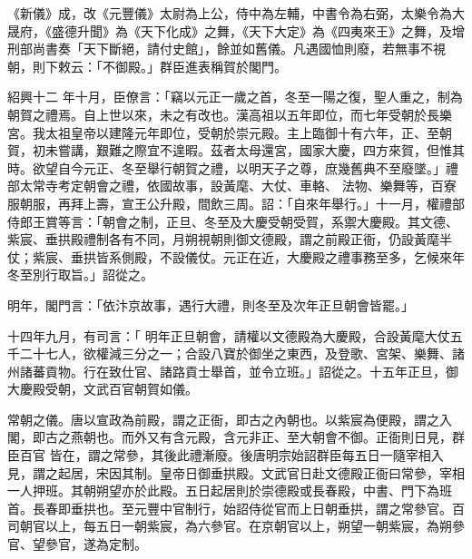 \begin{pinyinscope}
 《新儀》成，改《元豐儀》太尉為上公，侍中為左輔，中書令為右弼，太樂令為大晟府，《盛德升聞》為《天下化成》之舞，《天下大定》為《四夷來王》之舞，及增刑部尚書奏「天下斷絕，請付史館」，餘並如舊儀。凡遇國恤則廢，若無事不視朝，則下敕云：「不御殿。」群臣進表稱賀於閣門。



 紹興十二
 年十月，臣僚言：「竊以元正一歲之首，冬至一陽之復，聖人重之，制為朝賀之禮焉。自上世以來，未之有改也。漢高祖以五年即位，而七年受朝於長樂宮。我太祖皇帝以建隆元年即位，受朝於崇元殿。主上臨御十有六年，正、至朝賀，初未嘗講，艱難之際宜不遑暇。茲者太母還宮，國家大慶，四方來賀，但惟其時。欲望自今元正、冬至舉行朝賀之禮，以明天子之尊，庶幾舊典不至廢墜。」禮部太常寺考定朝會之禮，依國故事，設黃麾、大仗、車輅、
 法物、樂舞等，百寮服朝服，再拜上壽，宣王公升殿，間飲三周。詔：「自來年舉行。」十一月，權禮部侍郎王賞等言：「朝會之制，正旦、冬至及大慶受朝受賀，系禦大慶殿。其文德、紫宸、垂拱殿禮制各有不同，月朔視朝則御文德殿，謂之前殿正衙，仍設黃麾半仗；紫宸、垂拱皆系側殿，不設儀仗。元正在近，大慶殿之禮事務至多，乞候來年冬至別行取旨。」詔從之。



 明年，閣門言：「依汴京故事，遇行大禮，則冬至及次年正旦朝會皆罷。」



 十四年九月，有司言：「
 明年正旦朝會，請權以文德殿為大慶殿，合設黃麾大仗五千二十七人，欲權減三分之一；合設八寶於御坐之東西，及登歌、宮架、樂舞、諸州諸蕃貢物。行在致仕官、諸路貢士舉首，並令立班。」詔從之。十五年正旦，御大慶殿受朝，文武百官朝賀如儀。



 常朝之儀。唐以宣政為前殿，謂之正衙，即古之內朝也。以紫宸為便殿，謂之入閣，即古之燕朝也。而外又有含元殿，含元非正、至大朝會不御。正衙則日見，群臣百官
 皆在，謂之常參，其後此禮漸廢。後唐明宗始詔群臣每五日一隨宰相入見，謂之起居，宋因其制。皇帝日御垂拱殿。文武官日赴文德殿正衙曰常參，宰相一人押班。其朝朔望亦於此殿。五日起居則於崇德殿或長春殿，中書、門下為班首。長春即垂拱也。至元豐中官制行，始詔侍從官而上日朝垂拱，謂之常參官。百司朝官以上，每五日一朝紫宸，為六參官。在京朝官以上，朔望一朝紫宸，為朔參官、望參官，遂為定制。




\end{pinyinscope}
